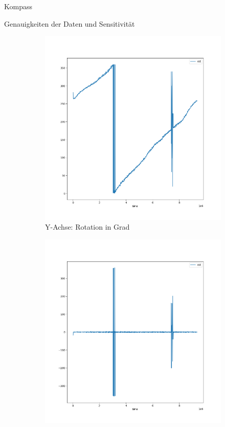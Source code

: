 \documentclass[12pt]{report}
\begin{document}
\begin{section}{Kompass}
\begin{subsection}{Genauigkeiten der Daten und Sensitivität}
  \begin{figure}[H]
    \centering
    \captionsetup{justification=centering}
    \captionsetup[subfigure]{labelformat=empty}
    \begin{subfigure}{0.45\linewidth}
      \centering
      \includegraphics[width=\linewidth]{lernportfolio_assets/CompassRotation360.png}
      \caption{Y-Achse: Rotation in Grad\newline}
    \end{subfigure}
    \begin{subfigure}{0.45\linewidth}
      \includegraphics[width=\linewidth]{lernportfolio_assets/CompassRotation360Diff.png}

\end{subfigure}
\end{figure}
\end{subsection}
\end{section}
\end{document}
